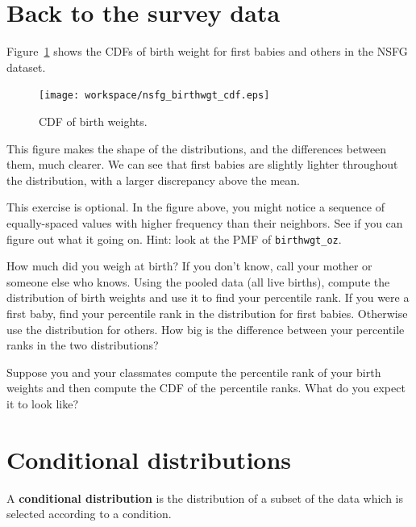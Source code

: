 \documentclass[12pt]{book}
\begin{document}
\section{Back to the survey data}

Figure~\ref{nsfg_birthwgt_cdf} shows the CDFs of birth weight for
first babies and others in the NSFG dataset.

\begin{figure}
\centerline{\texttt{[image: workspace/nsfg\_birthwgt\_cdf.eps]}}
\caption{CDF of birth weights.}
\label{nsfg_birthwgt_cdf}
\end{figure}

This figure makes the shape of the distributions, and the differences
between them, much clearer.  We can see that first babies are slightly
lighter throughout the distribution, with a larger discrepancy above 
the mean.

\begin{ex}
This exercise is optional.  In the figure above, you might notice
a sequence of equally-spaced values with higher frequency than
their neighbors.  See if you can figure out what it going on.
Hint: look at the PMF of \verb"birthwgt_oz".
\end{ex}

\begin{ex}
How much did you weigh at birth?  If you don't know, call your mother
or someone else who knows.  Using the pooled data (all live births),
compute the distribution of birth weights and use it to find your
percentile rank.  If you were a first baby, find your percentile rank
in the distribution for first babies.  Otherwise use the distribution
for others.  How big is the difference between your percentile ranks
in the two distributions?
\end{ex}

\begin{ex}
Suppose you and your classmates compute the percentile rank of your
birth weights and then compute the CDF of the percentile ranks.  What do
you expect it to look like?
\end{ex}


\section{Conditional distributions}

A {\bf conditional distribution} is the distribution of a subset of
the data which is selected according to a condition.
\end{document}
